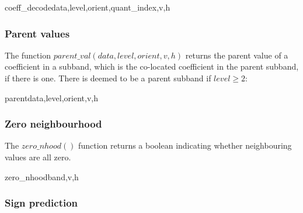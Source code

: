 \begin{pseudo}{coeff\_decode}{data,level,orient,quant\_index,v,h}
\end{pseudo}

\subsubsection{Parent values}
\label{parentval}
The function $parent\_val(data,level,orient,v, h)$ returns the parent value of a coefficient in a subband,
which is the co-located coefficient in the parent subband, if there is one. There is deemed to be a 
parent subband if $level\geq 2$:

\begin{pseudo}{parent}{data,level,orient,v,h}
\bsELSE
\bsEND
{}
\end{pseudo}

\subsubsection{Zero neighbourhood}
\label{zeronhood}

The $zero\_nhood()$ function returns a boolean indicating whether neighbouring
values are all zero.

\begin{pseudo}{zero\_nhood}{band,v,h}
    \bsRET{\false}
  \bsEND
      \bsRET{\false}
    \bsEND
  \bsEND
\bsELSE
      \bsRET{\false}
    \bsEND
  \bsEND
\bsEND
\bsRET{\true}
\end{pseudo}

\subsubsection{Sign prediction}
\label{signpredict}

